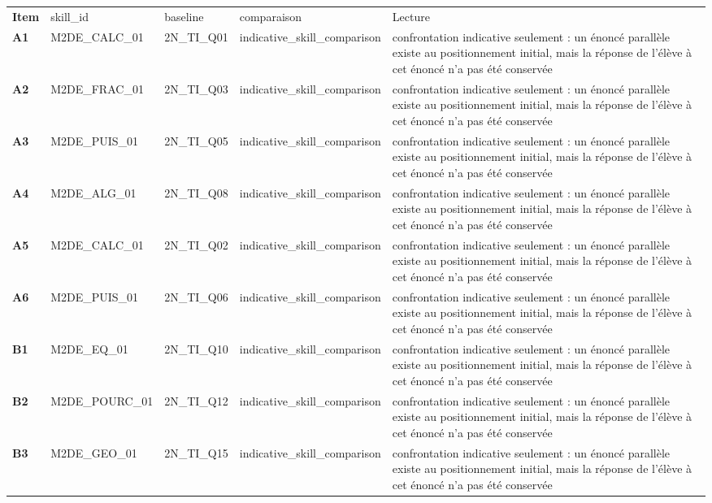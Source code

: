 \documentclass[10pt,a4paper]{article}
\begin{document}
\par\noindent\begin{tabularx}{\linewidth}{>{\bfseries}p{9mm} >{\ttfamily\scriptsize}p{25mm} >{\ttfamily\scriptsize}p{22mm} >{\ttfamily\scriptsize}p{16mm} X}
\rowcolor{Navy}\color{white}Item & \color{white}\scriptsize skill\_id & \color{white}\scriptsize baseline & \color{white}\scriptsize comparaison & \color{white}Lecture \\
A1 & M2DE\_CALC\_01 & 2N\_TI\_Q01 & indicative\_skill\_comparison & confrontation indicative seulement : un énoncé parallèle existe au positionnement initial, mais la réponse de l'élève à cet énoncé n'a pas été conservée \\
A2 & M2DE\_FRAC\_01 & 2N\_TI\_Q03 & indicative\_skill\_comparison & confrontation indicative seulement : un énoncé parallèle existe au positionnement initial, mais la réponse de l'élève à cet énoncé n'a pas été conservée \\
A3 & M2DE\_PUIS\_01 & 2N\_TI\_Q05 & indicative\_skill\_comparison & confrontation indicative seulement : un énoncé parallèle existe au positionnement initial, mais la réponse de l'élève à cet énoncé n'a pas été conservée \\
A4 & M2DE\_ALG\_01 & 2N\_TI\_Q08 & indicative\_skill\_comparison & confrontation indicative seulement : un énoncé parallèle existe au positionnement initial, mais la réponse de l'élève à cet énoncé n'a pas été conservée \\
A5 & M2DE\_CALC\_01 & 2N\_TI\_Q02 & indicative\_skill\_comparison & confrontation indicative seulement : un énoncé parallèle existe au positionnement initial, mais la réponse de l'élève à cet énoncé n'a pas été conservée \\
A6 & M2DE\_PUIS\_01 & 2N\_TI\_Q06 & indicative\_skill\_comparison & confrontation indicative seulement : un énoncé parallèle existe au positionnement initial, mais la réponse de l'élève à cet énoncé n'a pas été conservée \\
B1 & M2DE\_EQ\_01 & 2N\_TI\_Q10 & indicative\_skill\_comparison & confrontation indicative seulement : un énoncé parallèle existe au positionnement initial, mais la réponse de l'élève à cet énoncé n'a pas été conservée \\
B2 & M2DE\_POURC\_01 & 2N\_TI\_Q12 & indicative\_skill\_comparison & confrontation indicative seulement : un énoncé parallèle existe au positionnement initial, mais la réponse de l'élève à cet énoncé n'a pas été conservée \\
B3 & M2DE\_GEO\_01 & 2N\_TI\_Q15 & indicative\_skill\_comparison & confrontation indicative seulement : un énoncé parallèle existe au positionnement initial, mais la réponse de l'élève à cet énoncé n'a pas été conservée \\

\end{tabularx}
\end{document}
